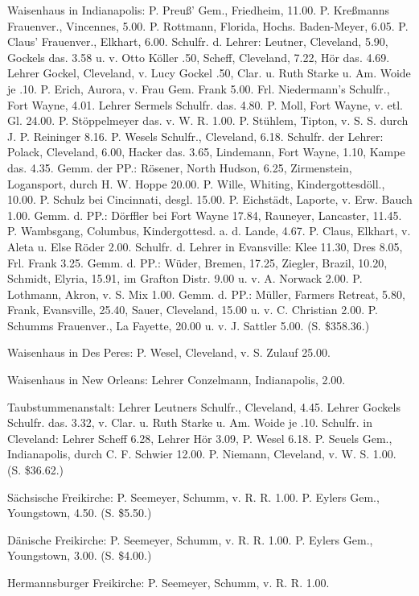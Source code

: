 Waisenhaus in Indianapolis: P. Preuß’ Gem., Friedheim, 11.00. P. Kreßmanns Frauenver., Vincennes, 5.00. P. Rottmann, Florida, Hochs. Baden-Meyer, 6.05. P. Claus’ Frauenver., Elkhart, 6.00. Schulfr. d. Lehrer: Leutner, Cleveland, 5.90, Gockels das. 3.58 u. v. Otto Köller .50, Scheff, Cleveland, 7.22, Hör das. 4.69. Lehrer Gockel, Cleveland, v. Lucy Gockel .50, Clar. u. Ruth Starke u. Am. Woide je .10. P. Erich, Aurora, v. Frau Gem. Frank 5.00. Frl. Niedermann’s Schulfr., Fort Wayne, 4.01. Lehrer Sermels Schulfr. das. 4.80. P. Moll, Fort Wayne, v. etl. Gl. 24.00. P. Stöppelmeyer das. v. W. R. 1.00. P. Stühlem, Tipton, v. S. S. durch J. P. Reininger 8.16. P. Wesels Schulfr., Cleveland, 6.18. Schulfr. der Lehrer: Polack, Cleveland, 6.00, Hacker das. 3.65, Lindemann, Fort Wayne, 1.10, Kampe das. 4.35. Gemm. der PP.: Rösener, North Hudson, 6.25, Zirmenstein, Logansport, durch H. W. Hoppe 20.00. P. Wille, Whiting, Kindergottesdöll., 10.00. P. Schulz bei Cincinnati, desgl. 15.00. P. Eichstädt, Laporte, v. Erw. Bauch 1.00. Gemm. d. PP.: Dörffler bei Fort Wayne 17.84, Rauneyer, Lancaster, 11.45. P. Wambsgang, Columbus, Kindergottesd. a. d. Lande, 4.67. P. Claus, Elkhart, v. Aleta u. Else Röder 2.00. Schulfr. d. Lehrer in Evansville: Klee 11.30, Dres 8.05, Frl. Frank 3.25. Gemm. d. PP.: Wüder, Bremen, 17.25, Ziegler, Brazil, 10.20, Schmidt, Elyria, 15.91, im Grafton Distr. 9.00 u. v. A. Norwack 2.00. P. Lothmann, Akron, v. S. Mix 1.00. Gemm. d. PP.: Müller, Farmers Retreat, 5.80, Frank, Evansville, 25.40, Sauer, Cleveland, 15.00 u. v. C. Christian 2.00. P. Schumms Frauenver., La Fayette, 20.00 u. v. J. Sattler 5.00. (S. \$358.36.)

Waisenhaus in Des Peres: P. Wesel, Cleveland, v. S. Zulauf 25.00.

Waisenhaus in New Orleans: Lehrer Conzelmann, Indianapolis, 2.00.

Taubstummenanstalt: Lehrer Leutners Schulfr., Cleveland, 4.45. Lehrer Gockels Schulfr. das. 3.32, v. Clar. u. Ruth Starke u. Am. Woide je .10. Schulfr. in Cleveland: Lehrer Scheff 6.28, Lehrer Hör 3.09, P. Wesel 6.18. P. Seuels Gem., Indianapolis, durch C. F. Schwier 12.00. P. Niemann, Cleveland, v. W. S. 1.00. (S. \$36.62.)

Sächsische Freikirche: P. Seemeyer, Schumm, v. R. R. 1.00. P. Eylers Gem., Youngstown, 4.50. (S. \$5.50.)

Dänische Freikirche: P. Seemeyer, Schumm, v. R. R. 1.00. P. Eylers Gem., Youngstown, 3.00. (S. \$4.00.)

Hermannsburger Freikirche: P. Seemeyer, Schumm, v. R. R. 1.00.

